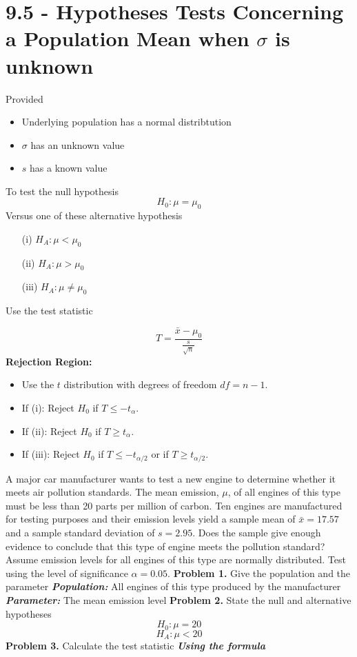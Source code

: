 \documentclass{report}
\begin{document}
\section*{9.5 - Hypotheses Tests Concerning a Population Mean when $\sigma$ is unknown}
Provided
\begin{itemize}[label=$\circ$]
  \item Underlying population has a normal distribtution 
  \item $\sigma$ has an unknown value
  \item $s$ has a known value
\end{itemize}
\bigbreak \noindent
To test the null hypothesis
$$ H_0 : \mu = \mu_0$$
\bigbreak \noindent
Versus one of these alternative hypothesis
\begin{enumerate}
    \item[(i)] $H_A: \mu < \mu_0$
    \item[(ii)] $H_A: \mu > \mu_0$
    \item[(iii)] $H_A: \mu \neq \mu_0$
\end{enumerate}
\bigbreak \noindent \bigbreak \noindent
Use the test statistic 

$$T = \frac{\bar{x} - \mu_0}{\frac{s}{\sqrt{n}}}$$
\bigbreak \noindent
{}
\bigbreak \noindent \bigbreak \noindent
\textbf{Rejection Region:}
\begin{itemize}
    \item Use the $t$ distribution with degrees of freedom $df = n - 1$.
    \item If (i): Reject $H_0$ if $T \leq -t_{\alpha}$.
    \item If (ii): Reject $H_0$ if $T \geq t_{\alpha}$.
    \item If (iii): Reject $H_0$ if $T \leq -t_{\alpha/2}$ or if $T \geq t_{\alpha/2}$.
\end{itemize}
\q
A major car manufacturer wants to test a new engine to determine whether it meets air pollution standards. The mean emission, $\mu$, of all engines of this type must be less than 20 parts per million of carbon. Ten engines are manufactured for testing purposes and their emission levels yield a sample mean of $\bar{x} = 17.57$ and a sample standard deviation of $s = 2.95$. Does the sample give enough evidence to conclude that this type of engine meets the pollution standard? Assume emission levels for all engines of this type are normally distributed. Test using the level of significance $\alpha = 0.05$.
\bigbreak \noindent
\textbf{Problem 1.} Give the population and the parameter
\bigbreak \noindent
\textit{\textbf{Population:}} All engines of this type produced by the manufacturer
\bigbreak \noindent
\textit{\textbf{Parameter:}} The mean emission level
\bigbreak \noindent
\textbf{Problem 2.} State the null and alternative hypotheses
$$ H_0 : \mu = 20$$
$$ H_A : \mu < 20$$
\bigbreak \noindent
\textbf{Problem 3.} Calculate the test statistic
\bigbreak \noindent
\textit{\textbf{Using the formula}}
\end{document}
